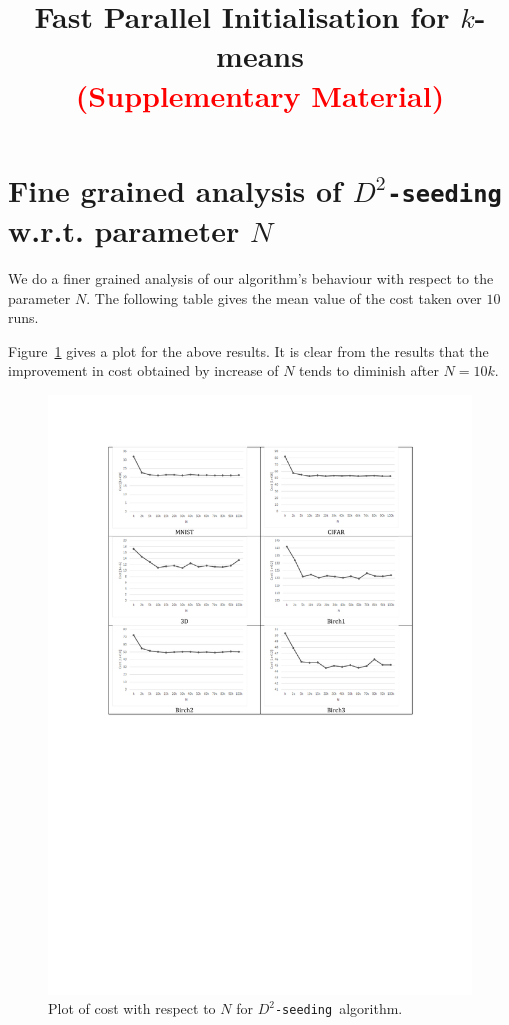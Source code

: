 \documentclass{article} %
\title{Fast Parallel Initialisation for $k$-means \\
\textcolor{red}{(Supplementary Material)}
}
\newcommand{\ds}{{\tt $D^2$-seeding}}
\begin{document}
\maketitle

%


\section{Fine grained analysis of {\tt $D^2$-seeding} w.r.t. parameter $N$}
We do a finer grained analysis of our algorithm's behaviour with respect to the parameter $N$.
The following table gives the mean value of the cost taken over $10$ runs.



Figure~\ref{fig:s1} gives a plot for the above results. It is clear from the results that the improvement in cost obtained by increase of $N$ tends to diminish after $N = 10k$.


\begin{figure}
\centering
\includegraphics[scale=1]{Plots/N-plots}
\caption{Plot of cost with respect to $N$ for \ds\ algorithm.}
\label{fig:s1}
\end{figure}
\end{document}
